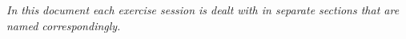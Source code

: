 \documentclass{res/theme}
\subtitle{Bruno Vandekerkhove}
\date{}
\begin{document}
\maketitle


\begin{center}\textit{In this document each exercise session is dealt with in separate sections that are named correspondingly.}%
\end{center}

\tableofcontents

\newpage
\newpage
\newpage

\end{document}
